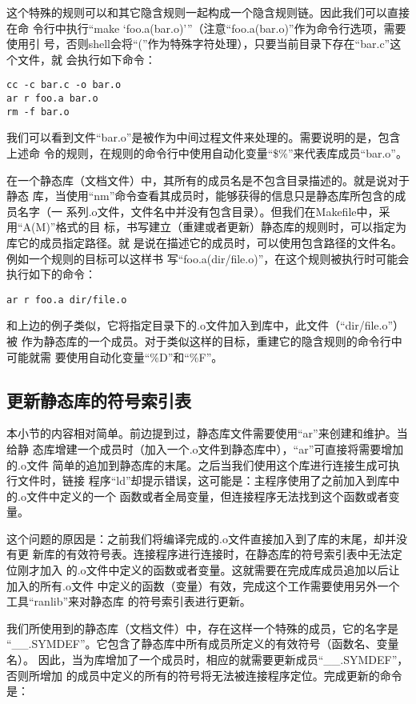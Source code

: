这个特殊的规则可以和其它隐含规则一起构成一个隐含规则链。因此我们可以直接在命
令行中执行“make ‘foo.a(bar.o)’”（注意“foo.a(bar.o)”作为命令行选项，需要使用引
号，否则shell会将“(”作为特殊字符处理），只要当前目录下存在“bar.c”这个文件，就
会执行如下命令：
\begin{Verbatim}[]
cc -c bar.c -o bar.o
ar r foo.a bar.o
rm -f bar.o
\end{Verbatim}

我们可以看到文件“bar.o”是被作为中间过程文件来处理的。需要说明的是，包含上述命
令的规则，在规则的命令行中使用自动化变量“\$\%”来代表库成员“bar.o”。

在一个静态库（文档文件）中，其所有的成员名是不包含目录描述的。就是说对于静态
库，当使用“nm”命令查看其成员时，能够获得的信息只是静态库所包含的成员名字（一
系列.o文件，文件名中并没有包含目录）。但我们在Makefile中，采用“A(M)”格式的目
标，书写建立（重建或者更新）静态库的规则时，可以指定为库它的成员指定路径。就
是说在描述它的成员时，可以使用包含路径的文件名。例如一个规则的目标可以这样书
写“foo.a(dir/file.o)”，在这个规则被执行时可能会执行如下的命令：

\begin{Verbatim}[]
ar r foo.a dir/file.o
\end{Verbatim}

和上边的例子类似，它将指定目录下的.o文件加入到库中，此文件（“dir/file.o”）被
作为静态库的一个成员。对于类似这样的目标，重建它的隐含规则的命令行中可能就需
要使用自动化变量“\%D”和“\%F”。

\subsection{更新静态库的符号索引表}
本小节的内容相对简单。前边提到过，静态库文件需要使用“ar”来创建和维护。当给静
态库增建一个成员时（加入一个.o文件到静态库中），“ar”可直接将需要增加的.o文件
简单的追加到静态库的末尾。之后当我们使用这个库进行连接生成可执行文件时，链接
程序“ld”却提示错误，这可能是：主程序使用了之前加入到库中的.o文件中定义的一个
函数或者全局变量，但连接程序无法找到这个函数或者变量。

这个问题的原因是：之前我们将编译完成的.o文件直接加入到了库的末尾，却并没有更
新库的有效符号表。连接程序进行连接时，在静态库的符号索引表中无法定位刚才加入
的.o文件中定义的函数或者变量。这就需要在完成库成员追加以后让加入的所有.o文件
中定义的函数（变量）有效，完成这个工作需要使用另外一个工具“ranlib”来对静态库
的符号索引表进行更新。

我们所使用到的静态库（文档文件）中，存在这样一个特殊的成员，它的名字是
“\_{}\_.SYMDEF”。它包含了静态库中所有成员所定义的有效符号（函数名、变量名）。
因此，当为库增加了一个成员时，相应的就需要更新成员“\_{}\_.SYMDEF”，否则所增加
的成员中定义的所有的符号将无法被连接程序定位。完成更新的命令是：

